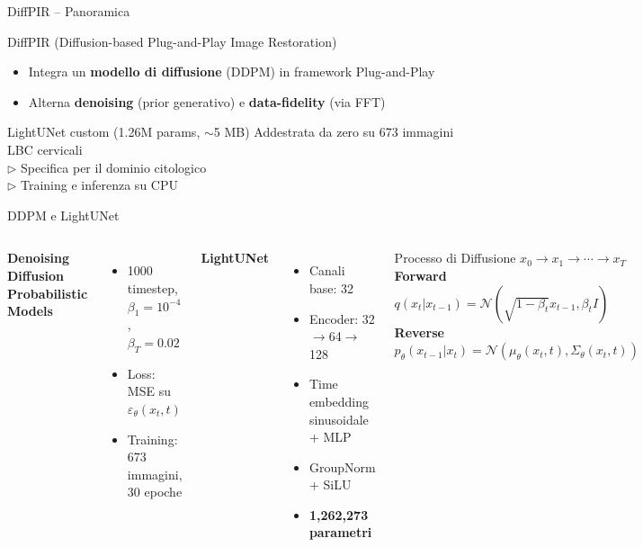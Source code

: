 \documentclass[italian,10pt]{beamer}
\begin{document}
\begin{frame}{DiffPIR -- Panoramica}
  \begin{block}{DiffPIR (Diffusion-based Plug-and-Play Image Restoration)}
    \begin{itemize}
      \item Integra un \textbf{modello di diffusione} (DDPM) in framework Plug-and-Play
      \item Alterna \textbf{denoising} (prior generativo) e \textbf{data-fidelity} (via FFT)
    \end{itemize}
  \end{block}
  \begin{alertblock}{LightUNet custom (1.26M params, $\sim$5 MB)}
    Addestrata da zero su 673 immagini LBC cervicali\\[0.1cm]
    $\triangleright$ Specifica per il dominio citologico \\[0.1cm]
    $\triangleright$ Training e inferenza su CPU
  \end{alertblock}
\end{frame}

\begin{frame}{DDPM e LightUNet}
  \begin{columns}
      \textbf{Denoising Diffusion Probabilistic Models}
      \begin{itemize}\small
        \item 1000 timestep, $\beta_1=10^{-4}$, $\beta_T=0.02$
        \item Loss: MSE su $\varepsilon_\theta(x_t,t)$
        \item Training: 673 immagini, 30 epoche
      \end{itemize}
      \vspace{0.2cm}
      \textbf{LightUNet}
      \begin{itemize}\small
        \item Canali base: 32
        \item Encoder: 32$\to$64$\to$128
        \item Time embedding sinusoidale + MLP
        \item GroupNorm + SiLU
        \item \textbf{1,262,273 parametri}
      \end{itemize}
      \begin{block}{Processo di Diffusione}
        \centering\small
        $x_0 \to x_1 \to \cdots \to x_T$ \\[0.1cm]
        \textbf{Forward} \\
        $q(x_t|x_{t-1}) = \mathcal{N}(\sqrt{1-\beta_t}x_{t-1}, \beta_t I)$ \\[0.2cm]
        \textbf{Reverse} \\
        $p_\theta(x_{t-1}|x_t) = \mathcal{N}(\mu_\theta(x_t,t), \Sigma_\theta(x_t,t))$
      \end{block}
  \end{columns}
\end{frame}
\end{document}
